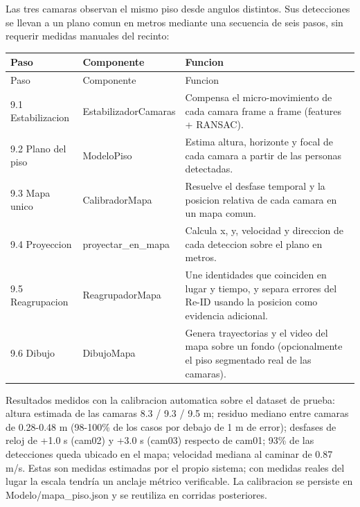 \documentclass[12pt,letterpaper]{article}
\begin{document}
Las tres camaras observan el mismo piso desde angulos distintos. Sus detecciones se llevan a un plano comun en metros mediante una secuencia de seis pasos, sin requerir medidas manuales del recinto:


\begingroup\small\setlength{\tabcolsep}{4pt}\renewcommand{\arraystretch}{1.2}

\begin{longtable}{P{0.28\textwidth}P{0.22\textwidth}P{0.42\textwidth}}
\toprule

Paso & Componente & Funcion \\

\midrule
\endfirsthead
\toprule
Paso & Componente & Funcion \\
\midrule
\endhead

9.1 Estabilizacion & EstabilizadorCamaras & Compensa el micro-movimiento de cada camara frame a frame (features + RANSAC). \\

9.2 Plano del piso & ModeloPiso & Estima altura, horizonte y focal de cada camara a partir de las personas detectadas. \\

9.3 Mapa unico & CalibradorMapa & Resuelve el desfase temporal y la posicion relativa de cada camara en un mapa comun. \\

9.4 Proyeccion & proyectar\_\allowbreak en\_\allowbreak mapa & Calcula x, y, velocidad y direccion de cada deteccion sobre el plano en metros. \\

9.5 Reagrupacion & ReagrupadorMapa & Une identidades que coinciden en lugar y tiempo, y separa errores del Re-ID usando la posicion como evidencia adicional. \\

9.6 Dibujo & DibujoMapa & Genera trayectorias y el video del mapa sobre un fondo (opcionalmente el piso segmentado real de las camaras). \\

\bottomrule
\end{longtable}
\endgroup

Resultados medidos con la calibracion automatica sobre el dataset de prueba: altura estimada de las camaras 8.3 / 9.3 / 9.5 m; residuo mediano entre camaras de 0.28-0.48 m (98-100\% de los casos por debajo de 1 m de error); desfases de reloj de +1.0 s (cam02) y +3.0 s (cam03) respecto de cam01; 93\% de las detecciones queda ubicado en el mapa; velocidad mediana al caminar de 0.87 m/s. Estas son medidas estimadas por el propio sistema; con medidas reales del lugar la escala tendría un anclaje métrico verificable. La calibracion se persiste en Modelo/\allowbreak mapa\_\allowbreak piso.json y se reutiliza en corridas posteriores.
\end{document}
